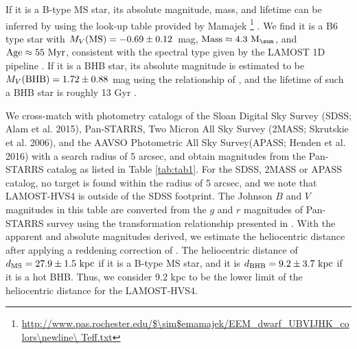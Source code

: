 \documentclass[iop, aj]{emulateapj}
\begin{document}
If it is a B-type MS star, its absolute magnitude, mass, and lifetime can be inferred by using the look-up table provided by Mamajek \footnote{\url{http://www.pas.rochester.edu/$\sim$emamajek/EEM\_dwarf\_UBVIJHK\_colors\newline\ Teff.txt}} \citep{2017ApJ...847L...9H}. We find it is a B6 type star with $M_{V}(\rm MS) = -0.69 \pm 0.12$~mag, $\rm Mass \approx 4.3~\rm M_{\sun}$, and $\rm Age \approx 55~\rm Myr$, consistent with the spectral type given by the LAMOST 1D pipeline \citep{2015RAA....15.1095L}. If it is a BHB star, its absolute magnitude is estimated to be $M_{V}(\rm BHB) = 1.72 \pm 0.88$ mag using the relationship of \citet{2002MNRAS.337...87C}, and the lifetime of such a BHB star is roughly 13 Gyr \citep{1996ApJ...466..359D, 2013A&A...549A.145L, 2016MNRAS.463.3449L}.

We cross-match with photometry catalogs of the Sloan Digital Sky Survey (SDSS; Alam et al. 2015), Pan-STARRS, Two Micron All Sky Survey (2MASS; Skrutskie et al. 2006), and the AAVSO Photometric All Sky Survey(APASS; Henden et al. 2016) with a search radius of 5 arcsec, and obtain magnitudes from the Pan-STARRS catalog as listed in Table \ref{tab:tab1}. For the SDSS, 2MASS or APASS catalog, no target is found within the radius of 5 arcsec, and we note that LAMOST-HVS4 is outside of the SDSS footprint. The Johnson $B$ and $V$ magnitudes in this table are converted from the $g$ and $r$ magnitudes of Pan-STARRS survey using the transformation relationship presented in \citet{2012ApJ...750...99T}. With the apparent and absolute magnitudes derived, we estimate the heliocentric distance after applying a reddening correction of \citet{2011ApJ...737..103S}. The heliocentric distance of $d_{\rm MS} = 27.9 \pm 1.5~\rm kpc$ if it is a B-type MS star, and it is $d_{\rm BHB} = 9.2 \pm 3.7~\rm kpc$ if it is a  hot BHB. Thus, we consider 9.2 kpc to be the lower limit of the heliocentric distance for the LAMOST-HVS4.
\end{document}
